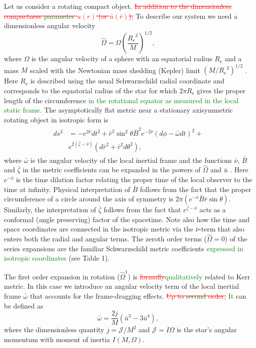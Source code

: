 \documentclass{aa}
\newcommand{\be}{\begin{equation}}
\newcommand{\ee}{\end{equation}}
\newcommand{\refe}[1]{\textcolor{green}{{#1}}}
\newcommand{\refedel}[1]{\textcolor{red}{\sout{#1}}}
\newcommand{\Req}{\ensuremath{R_{\mathrm{e}}}}
\newcommand{\sch}{Schwarzschild }
\newcommand{\rb}{\ensuremath{\bar{r}}}
\newcommand{\ub}{\ensuremath{\bar{u}}}
\newcommand{\wb}{\ensuremath{\bar{\omega}}}
\newcommand{\Ob}{\ensuremath{\hat{\Omega}}}
\newcommand{\nub}{\ensuremath{\bar{\nu}}}
\newcommand{\zetab}{\ensuremath{\bar{\zeta}}}
\newcommand{\Bb}{\ensuremath{\bar{B}}}
\begin{document}
Let us consider a rotating compact object.
\refedel{In addition to the dimensionless compactness \refe{parameter} $u(r)$ (or $\ub(\rb)$),} To describe our system we need a dimensionless angular velocity
\be
\Ob = \Omega \left( \frac{\Req^3}{M} \right)^{1/2},
\ee
where $\Omega$ is the angular velocity of a sphere with an equatorial radius $\Req$ and a mass $M$ scaled with the Newtonian mass shedding (Kepler) limit $(M/\Req^3)^{1/2}$ \citep[see][p.29]{rcs}.  
Here $\Req$ is described using the usual \sch radial coordinate and corresponds to the equatorial radius of the star for which $2\pi\Req$ gives the proper length of the circumference \refe{in the rotational equator as measured in the local static frame.}
The asymptotically flat metric near a stationary axisymmetric rotating object in isotropic form is \citep{BW71} 
\begin{align}\begin{split} \label{eq:BWmetric}
ds^2 & = -e^{2\nub} dt^2 +
     \rb^2 \sin^2\theta \Bb^2 e^{-2\nub}(d\phi - \wb dt)^2 + \\
     & e^{2(\zetab-\nub)}(d\rb^2 + \rb^2d\theta^2),
\end{split}\end{align}
where $\wb$ is the angular velocity of the local inertial frame and the functions $\nub$, $\Bb$ and $\zetab$ in the metric coefficients can be expanded in the powers of $\Ob$ and $\ub$ \citep{BI76}.
Here $e^{-\nub}$ is the time dilation factor relating the proper time of the local observer to the time at infinity.
Physical interpretation of $\Bb$ follows from the fact that the proper circumference of a circle around the axis of symmetry is $2\pi(e^{-\nub} \Bb \rb \sin\theta)$.
Similarly, the interpretation of $\zetab$ follows from the fact that $e^{\zetab - \nub}$ acts as a conformal (angle preserving) factor of the spacetime. %
Note also how the time and space coordinates are connected in the isotropic metric via the $\nub$-term that also enters both the radial and angular terms.
The zeroth order terms ($\Ob = 0$) of the series expansions are the familiar \sch metric coefficients \refe{expressed in isotropic coordinates} (see Table 1).

The first order expansion in rotation ($\Ob^1$) is \refedel{formally}\refe{qualitatively} related to Kerr metric.
In this case we introduce an angular velocity term of the local inertial frame $\wb$ that accounts for the frame-dragging effects. 
\refedel{Up to \refe{second} order,} 
\refe{It} can be defined as
\be\label{eq:wbar}
\wb = \frac{2 j}{M} (\ub^3 - 3\ub^4),
\ee
where the dimensionless quantity $j=\mathcal{J}/M^2$ and $\mathcal{J} = I \Omega$ is the star's angular momentum with moment of inertia $I(M,\Omega)$.
\end{document}
